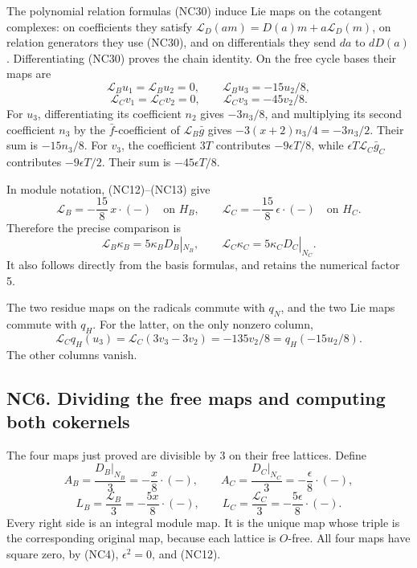 \documentclass[
  10pt,
]{article}
\begin{document}
The polynomial relation formulas (NC30) induce Lie maps on the cotangent
complexes: on coefficients they satisfy
\(\mathcal L_D(am)=D(a)m+a\mathcal L_D(m)\), on relation generators they
use (NC30), and on differentials they send \(da\) to \(dD(a)\).
Differentiating (NC30) proves the chain identity. On the free cycle
bases their maps are \[
\mathcal L_Bu_1=\mathcal L_Bu_2=0,\qquad
\mathcal L_Bu_3=-15u_2/8,
\] \[
\mathcal L_Cv_1=\mathcal L_Cv_2=0,\qquad
\mathcal L_Cv_3=-45v_2/8.
\tag{NC32}
\] For \(u_3\), differentiating its coefficient \(n_2\) gives
\(-3n_3/8\), and multiplying its second coefficient \(n_3\) by the
\(\bar f\)-coefficient of \(\mathcal L_B\bar g\) gives
\(-3(x+2)n_3/4=-3n_3/2\). Their sum is \(-15n_3/8\). For \(v_3\), the
coefficient \(3T\) contributes \(-9\epsilon T/8\), while
\(\epsilon T\mathcal L_C\bar g_C\) contributes \(-9\epsilon T/2\). Their
sum is \(-45\epsilon T/8\).

In module notation, (NC12)--(NC13) give \[
\mathcal L_B=-\frac{15}{8}\,x\cdot(-)\quad\text{on }H_B,\qquad
\mathcal L_C=-\frac{15}{8}\,\epsilon\cdot(-)\quad\text{on }H_C.
\tag{NC33}
\] Therefore the precise comparison is \[
\mathcal L_B\kappa_B=5\kappa_BD_B|_{N_B},\qquad
\mathcal L_C\kappa_C=5\kappa_CD_C|_{N_C}.
\tag{NC34}
\] It also follows directly from the basis formulas, and retains the
numerical factor 5.

The two residue maps on the radicals commute with \(q_N\), and the two
Lie maps commute with \(q_H\). For the latter, on the only nonzero
column, \[
\mathcal L_Cq_H(u_3)
=\mathcal L_C(3v_3-3v_2)=-135v_2/8
=q_H(-15u_2/8).
\tag{NC35}
\] The other columns vanish.

\subsection{NC6. Dividing the free maps and computing both
cokernels}\label{nc6.-dividing-the-free-maps-and-computing-both-cokernels}

The four maps just proved are divisible by 3 on their free lattices.
Define \[
A_B=\frac{D_B|_{N_B}}3=-\frac{x}{8}\cdot(-),\qquad
A_C=\frac{D_C|_{N_C}}3=-\frac{\epsilon}{8}\cdot(-),
\] \[
L_B=\frac{\mathcal L_B}3=-\frac{5x}{8}\cdot(-),\qquad
L_C=\frac{\mathcal L_C}3=-\frac{5\epsilon}{8}\cdot(-).
\tag{NC36}
\] Every right side is an integral module map. It is the unique map
whose triple is the corresponding original map, because each lattice is
\(O\)-free. All four maps have square zero, by (NC4), \(\epsilon^2=0\),
and (NC12).
\end{document}
